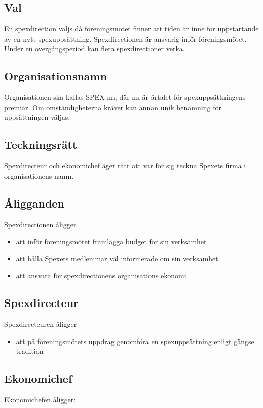 \documentclass[a4paper]{article}
\begin{document}
\subsection{Val}
En spexdirection väljs då föreningsmötet finner att tiden är inne för uppstartande av en nytt spexuppsättning. Spexdirectionen är ansvarig inför föreningsmötet. Under en övergångsperiod kan flera spexdirectioner verka.

\subsection{Organisationsnamn}
Organisationen ska kallas SPEX-nn, där nn är årtalet för spexuppsättningens premiär. Om omständigheterna kräver kan annan unik benämning för uppsättningen väljas.

\subsection{Teckningsrätt}
Spexdirecteur och ekonomichef äger rätt att var för sig teckna Spexets firma i organisationens namn.

\subsection{Åligganden}
Spexdirectionen åligger

\begin{itemize}
  \item att inför föreningsmötet framlägga budget för sin verksamhet
  \item att hålla Spexets medlemmar väl informerade om sin verksamhet
  \item att ansvara för spexdirectionens organisations ekonomi
\end{itemize}

\subsection{Spexdirecteur}
Spexdirecteuren åligger

\begin{itemize}
  \item att på föreningsmötets uppdrag genomföra en spexuppsättning enligt gängse tradition
\end{itemize}

\subsection{Ekonomichef}
Ekonomichefen åligger:
\end{document}
